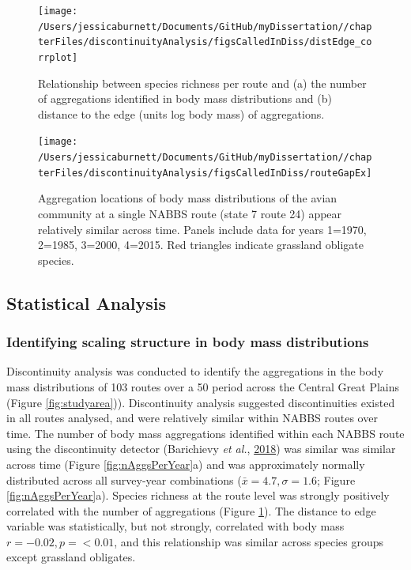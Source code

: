 \documentclass[12pt,twoside,openany]{reedthesis}
\begin{document}
\begin{figure}
\texttt{[image: /Users/jessicaburnett/Documents/GitHub/myDissertation//chapterFiles/discontinuityAnalysis/figsCalledInDiss/distEdge\_corrplot]} \caption{Relationship between species richness per route and (a) the number of aggregations identified in body mass distributions and (b) distance to the edge (units log body mass) of aggregations.}\label{fig:aggEdgeCorrPlot}
\end{figure}
\begin{figure}
\texttt{[image: /Users/jessicaburnett/Documents/GitHub/myDissertation//chapterFiles/discontinuityAnalysis/figsCalledInDiss/routeGapEx]} \caption{Aggregation locations of body mass distributions of the avian community at a single NABBS route (state 7 route 24) appear relatively similar across time. Panels include data for years 1=1970, 2=1985, 3=2000, 4=2015. Red triangles indicate grassland obligate species.}\label{fig:routeGapEx}
\end{figure}
\hypertarget{statistical-analysis-1}{%
\subsection{Statistical Analysis}\label{statistical-analysis-1}}

\hypertarget{identifying-scaling-structure-in-body-mass-distributions}{%
\subsubsection{Identifying scaling structure in body mass distributions}\label{identifying-scaling-structure-in-body-mass-distributions}}

Discontinuity analysis was conducted to identify the aggregations in the body mass distributions of 103 routes over a 50 period across the Central Great Plains (Figure \ref{fig:studyarea})). Discontinuity analysis suggested discontinuities existed in all routes analysed, and were relatively similar within NABBS routes over time. The number of body mass aggregations identified within each NABBS route using the discontinuity detector (Barichievy \emph{et al.}, \protect\hyperlink{ref-barichievy2018method}{2018}) was similar was similar across time (Figure \ref{fig:nAggsPerYear}a) and was approximately normally distributed across all survey-year combinations (\(\bar{x} = 4.7, \sigma = 1.6\); Figure \ref{fig:nAggsPerYear}a). Species richness at the route level was strongly positively correlated with the number of aggregations (Figure \ref{fig:aggEdgeCorrPlot}). The distance to edge variable was statistically, but not strongly, correlated with body mass \(r=-0.02, p = <0.01\), and this relationship was similar across species groups except grassland obligates.
\end{document}

